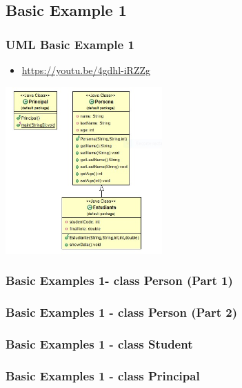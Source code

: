 \documentclass[11pt]{beamer}
\begin{document}
\begin{frame}
\section{Basic Example 1 }
\frametitle{UML Basic Example 1}
\begin{itemize}
\item \url{https://youtu.be/4gdhl-iRZZg}
\end {itemize}
\begin{center}
{\includegraphics[width=6.0cm]{img/UmlBasicExample1.jpeg}}
\end{center}
\end{frame}

\begin{frame}
\frametitle{Basic Examples 1- class Person (Part 1)}

\end{frame}
\begin{frame}
\frametitle{Basic Examples 1 - class Person (Part 2)}

\end{frame}
\begin{frame}
\frametitle{Basic Examples 1 - class Student}

\end{frame}
\begin{frame}
\frametitle{Basic Examples 1 - class Principal}

\end{frame}
\end{document}
